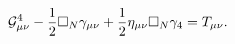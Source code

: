 \begin{equation}
\label{G^4}
{\cal G}^4_{\mu \nu}-\frac{1}{2} \Box_N \gamma_{\mu \nu}+\frac{1}{2} 
\eta_{\mu \nu} \Box_N \gamma_4 =T_{\mu \nu}.
\end{equation}

